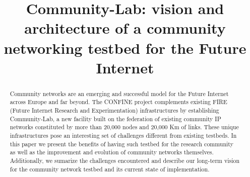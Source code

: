 \documentclass[conference]{IEEEtran}
\begin{document}
\title{Community-Lab: vision and architecture of a community networking testbed for the Future Internet}



\author{%
}

\maketitle


\begin{abstract}
Community networks are an emerging and successful model for the Future Internet
across Europe and far beyond. The CONFINE project complements existing FIRE (Future Internet
Research and Experimentation) infrastructures by establishing Community-Lab,
a new facility built on the federation of existing community IP networks constituted by more than 20,000 nodes and 20,000 Km of links. These unique infrastructures pose an interesting set of challenges different from existing testbeds. In this paper we present the benefits of having such testbed for the research community as well as the improvement and evolution of community networks themselves. Additionally, we sumarize the challenges encountered and describe our long-term vision for the community network testbed and its current state of implementation.
\end{abstract}
\end{document}
